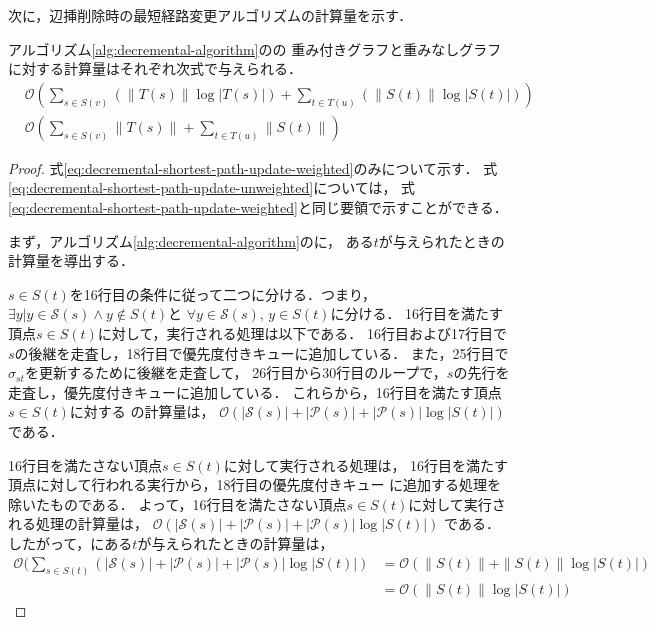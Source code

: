 次に，辺挿削除時の最短経路変更アルゴリズムの計算量を示す．

\begin{theorem}
  \label{thm:decremental-shortest-path-update}
  アルゴリズム\ref{alg:decremental-algorithm}のの
  重み付きグラフと重みなしグラフに対する計算量はそれぞれ次式で与えられる．
  \begin{align}
    &\mathcal{O}(\sum_{s\in S(v)}(\|T(s)\|\log|T(s)|)+\sum_{t\in T(u)}(\|S(t)\|\log|S(t)|))
    \label{eq:decremental-shortest-path-update-weighted} \\
    &\mathcal{O}(\sum_{s\in S(v)}\|T(s)\|+\sum_{t\in T(u)}\|S(t)\|)
    \label{eq:decremental-shortest-path-update-unweighted}
  \end{align}
\end{theorem}
\begin{proof}
  式\eqref{eq:decremental-shortest-path-update-weighted}のみについて示す．
  式\eqref{eq:decremental-shortest-path-update-unweighted}については，
  式\eqref{eq:decremental-shortest-path-update-weighted}と同じ要領で示すことができる．

  まず，アルゴリズム\ref{alg:decremental-algorithm}のに，
  ある$t$が与えられたときの計算量を導出する．

  $s\in S(t)$を16行目の条件に従って二つに分ける．つまり，
  $\exists y|y\in\mathcal{S}(s)\land y\notin S(t)$と
  $\forall y\in\mathcal{S}(s),\,y\in S(t)$に分ける．
  16行目を満たす頂点$s\in S(t)$に対して，実行される処理は以下である．
  16行目および17行目で$s$の後継を走査し，18行目で優先度付きキューに追加している．
  また，25行目で$\sigma_{st}$を更新するために後継を走査して，
  26行目から30行目のループで，$s$の先行を走査し，優先度付きキューに追加している．
  これらから，16行目を満たす頂点$s\in S(t)$に対する
  の計算量は，
  $\mathcal{O}(|\mathcal{S}(s)|+|\mathcal{P}(s)|+|\mathcal{P}(s)|\log|S(t)|)$
  である．

  16行目を満たさない頂点$s\in S(t)$に対して実行される処理は，
  16行目を満たす頂点に対して行われる実行から，18行目の優先度付きキュー
  に追加する処理を除いたものである．
  よって，16行目を満たさない頂点$s\in S(t)$に対して実行される処理の計算量は，
  $\mathcal{O}(|\mathcal{S}(s)|+|\mathcal{P}(s)|+|\mathcal{P}(s)|\log|S(t)|)$
  である．したがって，にある$t$が与えられたときの計算量は，
  \begin{equation*}
    \begin{aligned}
      \mathcal{O}(\sum_{s\in S(t)}(|\mathcal{S}(s)|+|\mathcal{P}(s)|+|\mathcal{P}(s)|\log|S(t)|)
      &=\mathcal{O}(\|S(t)\|+\|S(t)\|\log|S(t)|) \\
      &=\mathcal{O}(\|S(t)\|\log|S(t)|)
    \end{aligned}
  \end{equation*}


\end{proof}
